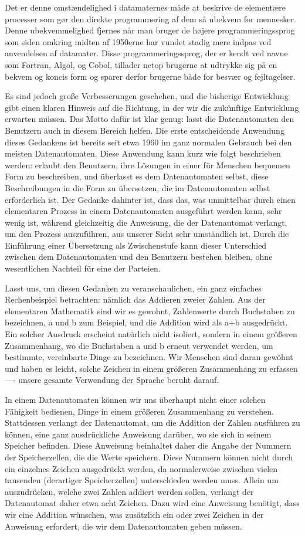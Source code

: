 {Det er denne omstændelighed i datamaternes måde at beskrive de elementære processer som gør den direkte programmering af dem så ubekvem for mennesker. Denne ubekvemmelighed fjernes når man bruger de højere programmeringssprog som siden omkring midten af 1950erne har vundet stadig mere indpas ved anvendelsen af datamater. Disse programmeringssprog, der er kendt ved navne som Fortran, Algol, og Cobol, tillader netop brugerne at udtrykke sig på en bekvem og koncis form og sparer derfor brugerne både for besvær og fejltagelser. 
}{
Es sind jedoch große Verbesserungen geschehen, und die bisherige Entwicklung gibt einen klaren Hinweis auf die Richtung, in der wir die zukünftige Entwicklung erwarten müssen. Das Motto dafür ist klar genug: lasst die Datenautomaten den Benutzern auch in diesem Bereich helfen. Die erste entscheidende Anwendung dieses Gedankens ist bereits seit etwa 1960 im ganz normalen Gebrauch bei den meisten Datenautomaten. Diese Anwendung kann kurz wie folgt beschrieben werden: erlaubt den Benutzern, ihre Lösungen in einer für Menschen bequemen Form zu beschreiben, und überlasst es dem Datenautomaten selbst, diese Beschreibungen in die Form zu übersetzen, die im Datenautomaten selbst erforderlich ist. Der Gedanke dahinter ist, dass das, was unmittelbar durch einen elementaren Prozess in einem Datenautomaten ausgeführt werden kann, sehr wenig ist, während gleichzeitig die Anweisung, die der Datenautomat verlangt, um den Prozess auszuführen, aus unserer Sicht sehr umständlich ist. Durch die Einführung einer Übersetzung als Zwischenstufe kann dieser Unterschied zwischen dem Datenautomaten und den Benutzern bestehen bleiben, ohne wesentlichen Nachteil für eine der Parteien.

Lasst uns, um diesen Gedanken zu veranschaulichen, ein ganz einfaches Rechenbeispiel betrachten: nämlich das Addieren zweier Zahlen. Aus der elementaren Mathematik sind wir es gewohnt, Zahlenwerte durch Buchstaben zu bezeichnen, a und b zum Beispiel, und die Addition wird als a+b ausgedrückt. Ein solcher Ausdruck erscheint natürlich nicht isoliert, sondern in einem größeren Zusammenhang, wo die Buchstaben a und b erneut verwendet werden, um bestimmte, vereinbarte Dinge zu bezeichnen. Wir Menschen sind daran gewöhnt und haben es leicht, solche Zeichen in einem größeren Zusammenhang zu erfassen —- unsere gesamte Verwendung der Sprache beruht darauf.

In einem Datenautomaten können wir uns überhaupt nicht einer solchen Fähigkeit bedienen, Dinge in einem größeren Zusammenhang zu verstehen. Stattdessen verlangt der Datenautomat, um die Addition der Zahlen ausführen zu können, eine ganz ausdrückliche Anweisung darüber, wo sie sich in seinem Speicher befinden. Diese Anweisung beinhaltet daher die Angabe der Nummern der Speicherzellen, die die Werte speichern. Diese Nummern können nicht durch ein einzelnes Zeichen ausgedrückt werden, da normalerweise zwischen vielen tausenden (derartiger Speicherzellen) unterschieden werden muss. Allein um auszudrücken, welche zwei Zahlen addiert werden sollen, verlangt der Datenautomat daher etwa acht Zeichen. Dazu wird eine Anweisung benötigt, dass wir eine Addition wünschen, was zusätzlich ein oder zwei Zeichen in der Anweisung erfordert, die wir dem Datenautomaten geben müssen.

}
